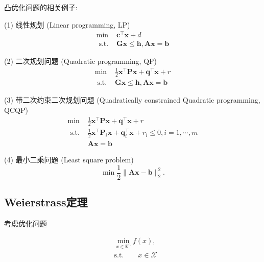 \begin{example}凸优化问题的相关例子:
\par    (1) 线性规划 (Linear programming, LP)\cite{1963Linear}
    \begin{equation}
    \begin{array}{ll}
    \min & \bm{c}^{\top} \bm{x}+d \\
    \text { s.t. } & \bm{G} \bm{x} \leq \bm{h}, \bm{A} \bm{x}=\bm{b}
    \end{array}
        \nonumber
    \end{equation}
\par    (2) 二次规划问题 (Quadratic programming, QP)\cite{1995Sequential}
    \begin{equation}
    \begin{array}{ll}
    \min & \frac{1}{2} \bm{x}^{\top} \bm{P} \bm{x}+\bm{q}^{\top} \bm{x}+r \\
    \text { s.t. } & \bm{G} \bm{x} \leq \bm{h}, \bm{A} \bm{x}=\bm{b}
    \end{array}
        \nonumber
    \end{equation}
\par    (3) 带二次约束二次规划问题 (Quadratically constrained Quadratic programming, QCQP)\cite{1982Quadratically}
    \begin{equation}
    \begin{array}{ll}
    \min & \frac{1}{2} \bm{x}^{\top} \bm{P} \bm{x}+\bm{q}^{\top} \bm{x}+r \\
    \text { s.t. } & \frac{1}{2} \bm{x}^{\top} \bm{P}_{i} \bm{x}+\bm{q}_{i}^{\top} \bm{x}+r_{i} \leq 0, i=1, \cdots, m \\
    & \bm{A} \bm{x}=\bm{b}
    \end{array}
        \nonumber
    \end{equation}
\par (4) 最小二乘问题 (Least square problem)\cite{1989Least}
    \begin{equation}
    \min \frac{1}{2}\|\bm{A} \bm{x}-\bm{b}\|_{2}^{2} .
        \nonumber
    \end{equation}
\end{example}

\subsection{Weierstrass定理}
考虑优化问题

\begin{equation}
    \begin{split}
        &\mathop{\mathrm{min}}\limits_{x\in \mathbb{R}^{n}} f(x), \\
        &\mathrm{s. t.} \quad\quad x\in \mathcal{X}
    \end{split}
\end{equation}

